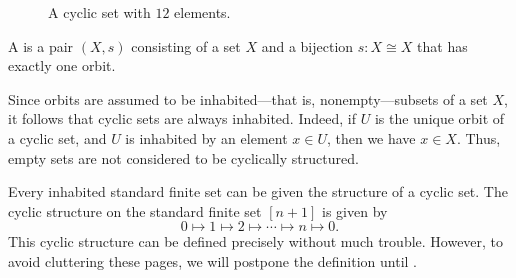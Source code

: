 \begin{figure}[t]
  \centering
  \caption[A cyclic set with $12$ elements]{\label{figure:cyclically-ordered-set}A cyclic set with $12$ elements.}
\end{figure}

\begin{definition}
  A  is a pair $(X,s)$ consisting of a set $X$ and a bijection $s:X\cong X$ that has exactly one orbit.
\end{definition}

\begin{remark}
  Since orbits are assumed to be inhabited---that is, nonempty---subsets of a set $X$, it follows that cyclic sets are always inhabited. Indeed, if $U$ is the unique orbit of a cyclic set, and $U$ is inhabited by an element $x\in U$, then we have $x\in X$. Thus, empty sets are not considered to be cyclically structured.
\end{remark}

\begin{example}
  Every inhabited standard finite set can be given the structure of a cyclic set. The cyclic structure on the standard finite set $[n+1]$ is given by
  \begin{equation*}
    0\mapsto 1 \mapsto 2 \mapsto \cdots \mapsto n \mapsto 0.
  \end{equation*}
  This cyclic structure can be defined precisely without much trouble. However, to avoid cluttering these pages, we will postpone the definition until .
\end{example}

